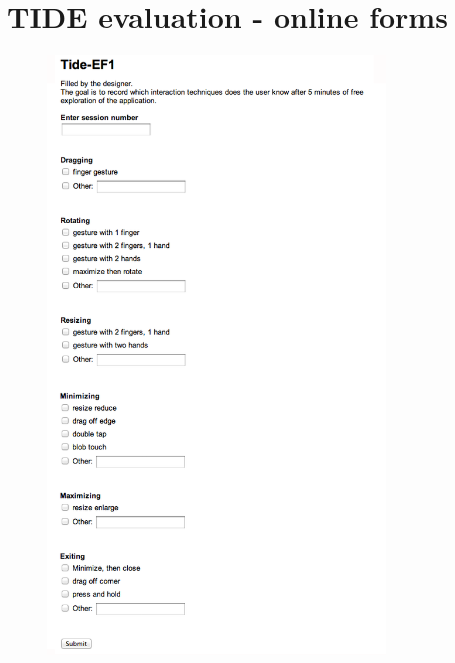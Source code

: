 \chapter{TIDE evaluation - online forms}
\label{app:evalforms}

\begin{figure}[htb]
  \centering
    \includegraphics[width=0.8\textwidth]{images/evalform1}
\end{figure}

